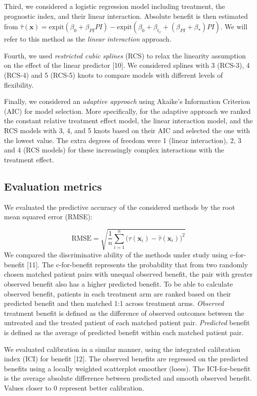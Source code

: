 \documentclass[]{elsarticle} %
\begin{document}
Third, we considered a logistic regression model including treatment,
the prognostic index, and their linear interaction. Absolute benefit is
then estimated from
\(\hat{\tau}(\bm{x})=\text{expit}(\beta_0+\beta_{PI}PI) - \text{expit}(\beta_0+\beta_{t_x}+(\beta_{PI}+\beta_*)PI)\).
We will refer to this method as the \emph{linear interaction} approach.

Fourth, we used \emph{restricted cubic splines} (RCS) to relax the
linearity assumption on the effect of the linear predictor {[}10{]}. We
considered splines with 3 (RCS-3), 4 (RCS-4) and 5 (RCS-5) knots to
compare models with different levels of flexibility.

Finally, we considered an \emph{adaptive approach} using Akaike's
Information Criterion (AIC) for model selection. More specifically, for
the adaptive approach we ranked the constant relative treatment effect
model, the linear interaction model, and the RCS models with 3, 4, and 5
knots based on their AIC and selected the one with the lowest value. The
extra degrees of freedom were 1 (linear interaction), 2, 3 and 4 (RCS
models) for these increasingly complex interactions with the treatment
effect.

\hypertarget{evaluation-metrics}{%
\subsection{Evaluation metrics}\label{evaluation-metrics}}

We evaluated the predictive accuracy of the considered methods by the
root mean squared error (RMSE):

\[\text{RMSE}=\sqrt{\frac{1}{n}\sum_{i=1}^n\big(\tau(\bm{x}_i) - \hat{\tau}(\bm{x}_i)\big)^2}\]
We compared the discriminative ability of the methods under study using
c-for-benefit {[}11{]}. The c-for-benefit represents the probability
that from two randomly chosen matched patient pairs with unequal
observed benefit, the pair with greater observed benefit also has a
higher predicted benefit. To be able to calculate observed benefit,
patients in each treatment arm are ranked based on their predicted
benefit and then matched 1:1 across treatment arms. \emph{Observed}
treatment benefit is defined as the difference of observed outcomes
between the untreated and the treated patient of each matched patient
pair. \emph{Predicted} benefit is defined as the average of predicted
benefit within each matched patient pair.

We evaluated calibration in a similar manner, using the integrated
calibration index (ICI) for benefit {[}12{]}. The observed benefits are
regressed on the predicted benefits using a locally weighted scatterplot
smoother (loess). The ICI-for-benefit is the average absolute difference
between predicted and smooth observed benefit. Values closer to \(0\)
represent better calibration.
\end{document}
